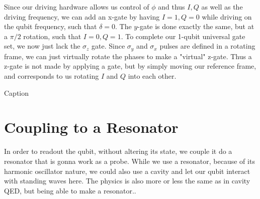 Since our driving hardware allows us control of $\phi$ and thus $I, Q$ as well as the driving frequency, we can add an x-gate by having $I = 1, Q = 0$ while driving on the qubit frequency, such that $\delta = 0$. The $y$-gate is done exactly the same, but at a $\pi/2$ rotation, such that $I = 0, Q = 1$. 
To complete our 1-qubit universal gate set, we now just lack the $\sigma_z$ gate. Since $\sigma_y$ and $\sigma_x$ pulses are defined in a rotating frame, we can just virtually rotate the phases to make a "virtual" z-gate. Thus a z-gate is not made by applying a gate, but by simply moving our reference frame, and corresponds to us rotating $I$ and $Q$ into each other. \cite{krantz_quantum_2019}

\begin{marginfigure}[-5 cm]
    \centering
    \caption{Caption}
    \label{fig:control_virtual_z}
\end{marginfigure}


\section{Coupling to a Resonator}
In order to readout the qubit, without altering its state, we couple it do a resonator that is gonna work as a probe. While we use a resonator, because of its harmonic oscillator nature, we could also use a cavity and let our qubit interact with standing waves here. The physics is also more or less the same as in cavity QED, but being able to make a resonator..

